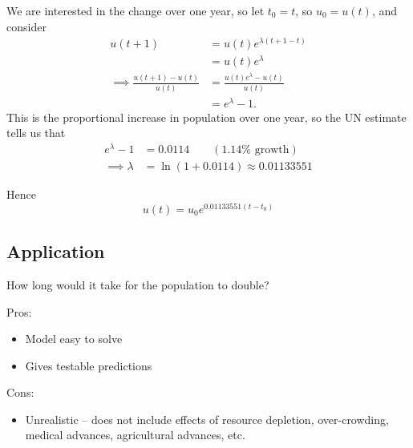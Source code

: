 \begin{example}
We are interested in the change over one year, so let $t_{0}=t$, so $u_{0}=u(t)$, and consider
  \begin{align*}
    u(t + 1) & = u(t)e^{\lambda(t + 1 - t)}  \\
    & = u(t)e^{\lambda}  \\
    \implies \frac{u(t+1)-u(t)}{u(t)} & = \frac{u(t)e^{\lambda} - u(t)}{u(t)}  \\
    & = e^{\lambda} - 1.
  \end{align*}
This is the proportional increase in population over one year, so the UN estimate tells us that
  \begin{align*}
    e^{\lambda} - 1 & = 0.0114 \qquad (1.14\% \text{ growth})  \\
    \implies \lambda & = \ln (1+ 0.0114) \approx 0.01133551
  \end{align*}

Hence
\[
 u(t) = u_{0} e^{0.01133551(t-t_{0})}
\]
\end{example}

\subsection*{Application}

How long would it take for the population to double?

Pros:
\begin{itemize}[topsep=0pt]
\item Model easy to solve
\item Gives testable predictions
\end{itemize}

Cons:
\begin{itemize}[topsep=0pt]
 \item Unrealistic -- does not include effects of resource depletion, over-crowding, medical advances, agricultural advances, etc.
\end{itemize}


